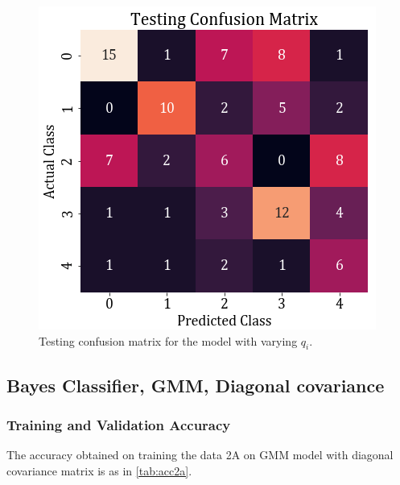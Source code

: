 \documentclass[11pt,a4paper]{article}
\begin{document}
\begin{figure}[H]
    \centering
    \includegraphics[scale=0.5]{images/2A/2a_full_cross_test.png}
    \caption{Testing confusion matrix for the model with varying $q_i$.}
\end{figure}


\subsection{Bayes Classifier, GMM, Diagonal covariance}
\subsubsection{Training and Validation Accuracy}
The accuracy obtained on training the data 2A on GMM model with diagonal covariance matrix is as in \autoref{tab:acc2a}.

\end{document}
